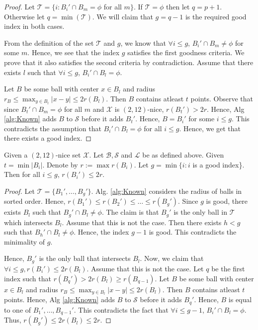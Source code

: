 \documentclass[11pt]{article}
\newcommand{\mc}{\mathcal}
\begin{document}
\begin{proof}
Let $\mc T = \{i: B_i' \cap B_m = \phi$ for all $m\}$. If $\mc T = \phi$ then let $q = p+1$. Otherwise let $q = \min(\mc T)$. We will claim that $g = q-1$ is the required good index in both cases.

From the definition of the set $\mc T$ and $g$, we know that $\forall i \le g$, $B_i' \cap B_m \neq \phi$ for some $m$. Hence, we see that the index $g$ satisfies the first goodness criteria. We prove that it also satisfies the second criteria by contradiction. Assume that there exists $l$ such that $\forall i \le g$, $B_i' \cap B_l = \phi$.

Let $B$ be some ball with center $x \in B_l$ and radius $r_B \le \max_{y \in B_l} |x-y| \le 2r(B_l)$. Then $B$ contains atleast $t$ points. Observe that since $B_t' \cap B_m = \phi$ for all $m$ and $\mc X$ is $(2,12)$-nice, $r(B_t') > 2r$. Hence, Alg \ref{alg:Known} adds $B$ to $\mc S$ before it adds $B_t'$. Hence, $B = B_i'$ for some $i\le g$. This contradicts the assumption that $B_i' \cap B_l = \phi$ for all $i \le g$. Hence, we get that there exists a good index. 
\end{proof}


\begin{lemma}
Given a $(2,12)$-nice set $\mc X$. Let $\mc B, \mc S$ and $\mc L$ be as defined above. Given $t = \min |B_i|$. Denote by $r := \max r(B_i)$. Let $g = \min \{i: i$ is a good index\}. Then for all $i\le g$, $r(B_i') \le 2r$.

\label{lemma:centerDist}
\end{lemma}

\begin{proof}
Let $\mc T = \{B_1', \ldots, B_g'\}$. Alg. \ref{alg:Known} considers the radius of balls in sorted order. Hence, $r(B_1') \le r(B_2') \le \ldots \le r(B_g')$. Since $g$ is good, there exists $B_l$ such that $B_g' \cap B_l \neq \phi$. The claim is that $B_g'$ is the only ball in $\mc T$ which intersects $B_l$. Assume that this is not the case. Then there exists $h < g$ such that $B_h' \cap B_l \neq \phi$. Hence, the index $g-1$ is good. This contradicts the minimality of $g$. 

Hence, $B_g'$ is the only ball that intersects $B_l$. Now, we claim that $\forall i \le g, r(B_i') \le 2r(B_l)$. Assume that this is not the case. Let $q$ be the first index such that $r(B_q') > 2r(B_l) \ge r(B_{q-1})$. Let $B$ be some ball with center $x \in B_l$ and radius $r_B \le \max_{y \in B_l} |x-y| \le 2r(B_l)$. Then $B$ contains atleast $t$ points. Hence, Alg \ref{alg:Known} adds $B$ to $\mc S$ before it adds $B_q'$. Hence, $B$ is equal to one of $B_1', \ldots, B_{q-1}'$. This contradicts the fact that $\forall i \le g-1$, $B_i' \cap B_l = \phi$. Thus, $r(B_g') \le 2r(B_l) \le 2r$. 
\end{proof}
\end{document}
